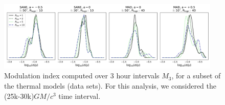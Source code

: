 \begin{figure}
\centering
\includegraphics[width=0.95\textwidth]{figures/mi_rlow_select_models.png}
\caption{Modulation index computed over 3 hour intervals $M_{3}$, for a subset of the thermal models (\kharma data sets). For this analysis, we considered the (25k-30k)$GM/c^{3}$ time interval.}
\label{fig:mi_rlow}
\end{figure}


